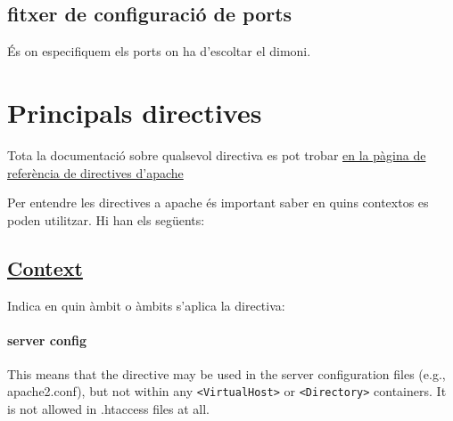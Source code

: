 \documentclass[a4paper, 11pt]{article}
\begin{document}

\subsection{fitxer de configuració de ports}
És on especifiquem els ports on ha d'escoltar el dimoni.
\section{Principals directives}

Tota la documentació sobre qualsevol directiva es pot trobar \href{https://httpd.apache.org/docs/2.4/mod/directives.html}{en la pàgina de referència de directives d'apache}

Per entendre les directives a apache \'es important saber en quins contextos es poden utilitzar. Hi han els següents:

\subsection{\href{http://localhost/apache2-doc/es/mod/directive-dict.html#Context}{Context}} Indica en quin àmbit o àmbits s'aplica la directiva:
\paragraph{server config} This means that the directive may be used in the server configuration files (e.g., apache2.conf), but not within any \verb+<VirtualHost>+ or \verb+<Directory>+ containers. It is not allowed in .htaccess files at all. 
\end{document}
